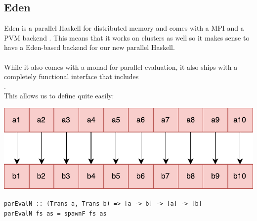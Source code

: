 \subsection{Eden}
Eden  is a parallel Haskell for distributed memory and comes with a MPI and a PVM backend \cite{eden_hackage, Loogen2012, eden_homepage}. This means that it works on clusters as well so it makes sense to have a Eden-based backend for our new parallel Haskell.
\\\\
While it also comes with a monad  for parallel evaluation, it also ships with a completely functional interface that includes
\\
.
\\
This allows us to define  quite easily:
\begin{center}
	\includegraphics[scale=0.5]{images/parEvalNEden}
\end{center}
\begin{lstlisting}[frame=htrbl]
parEvalN :: (Trans a, Trans b) => [a -> b] -> [a] -> [b]
parEvalN fs as = spawnF fs as
\end{lstlisting}